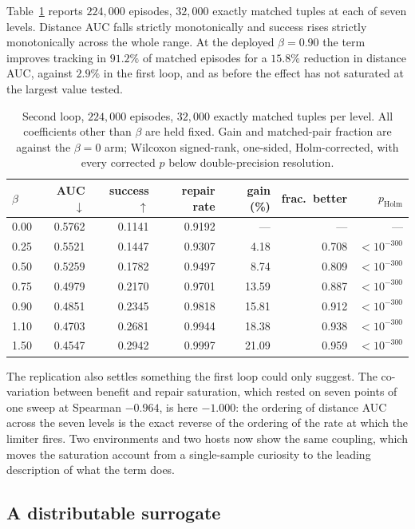 \documentclass[11pt,a4paper]{article}
\begin{document}
Table~\ref{tab:loop2} reports $224{,}000$ episodes, $32{,}000$ exactly matched tuples at each
of seven levels. Distance AUC falls strictly monotonically and success rises strictly
monotonically across the whole range. At the deployed $\beta = 0.90$ the term improves
tracking in $91.2\%$ of matched episodes for a $15.8\%$ reduction in distance AUC, against
$2.9\%$ in the first loop, and as before the effect has not saturated at the largest value
tested.

\begin{table}[htbp]
\centering
\small
\caption{Second loop, $224{,}000$ episodes, $32{,}000$ exactly matched tuples per level. All
coefficients other than $\beta$ are held fixed. Gain and matched-pair fraction are against
the $\beta = 0$ arm; Wilcoxon signed-rank, one-sided, Holm-corrected, with every corrected
$p$ below double-precision resolution.}
\label{tab:loop2}
\begin{tabular}{lrrrrrr}
\toprule
$\beta$ & AUC $\downarrow$ & success $\uparrow$ & repair rate & gain (\%) & frac.\ better & $p_{\text{Holm}}$ \\
\midrule
0.00 & 0.5762 & 0.1141 & 0.9192 & --- & --- & --- \\
0.25 & 0.5521 & 0.1447 & 0.9307 & 4.18 & 0.708 & $<10^{-300}$ \\
0.50 & 0.5259 & 0.1782 & 0.9497 & 8.74 & 0.809 & $<10^{-300}$ \\
0.75 & 0.4979 & 0.2170 & 0.9701 & 13.59 & 0.887 & $<10^{-300}$ \\
0.90 & 0.4851 & 0.2345 & 0.9818 & 15.81 & 0.912 & $<10^{-300}$ \\
1.10 & 0.4703 & 0.2681 & 0.9944 & 18.38 & 0.938 & $<10^{-300}$ \\
1.50 & 0.4547 & 0.2942 & 0.9997 & 21.09 & 0.959 & $<10^{-300}$ \\
\bottomrule
\end{tabular}
\end{table}

The replication also settles something the first loop could only suggest. The co-variation
between benefit and repair saturation, which rested on seven points of one sweep at
Spearman $-0.964$, is here $-1.000$: the ordering of distance AUC across the seven levels is
the exact reverse of the ordering of the rate at which the limiter fires. Two environments
and two hosts now show the same coupling, which moves the saturation account from a
single-sample curiosity to the leading description of what the term does.

\subsection{A distributable surrogate}
\label{sec:surrogate}
\end{document}
